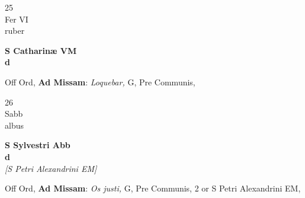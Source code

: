 \documentclass[10pt, openany]{book}
\begin{document}
        \begin{center}
            \begin{minipage}{3.5in}
                \vspace{2em}
                \begin{minipage}{0.5in}
                    {\Huge 25} \\
                    {\normalsize Fer VI} \\
                    {\normalsize ruber}
                \end{minipage}
                \begin{minipage}{3.0in}
                    \textbf{ \large S Catharinæ VM \\
                    \textnormal{\normalsize d}} \\ 
                \end{minipage}
                \begin{justify}Off Ord, \textbf{Ad Missam}: \textit{Loquebar,} G, Pre Communis,   
                \end{justify}
            \end{minipage}
        \end{center}
    
        \begin{center}
            \begin{minipage}{3.5in}
                \vspace{2em}
                \begin{minipage}{0.5in}
                    {\Huge 26} \\
                    {\normalsize Sabb} \\
                    {\normalsize albus}
                \end{minipage}
                \begin{minipage}{3.0in}
                    \textbf{ \large S Sylvestri Abb \\
                    \textnormal{\normalsize d}} \\ \textit{[S Petri Alexandrini EM]} \\ 
                \end{minipage}
                \begin{justify}Off Ord, \textbf{Ad Missam}: \textit{Os justi,} G, Pre Communis, 2 or S Petri Alexandrini EM,   
                \end{justify}
            \end{minipage}
        \end{center}
    
\end{document}
